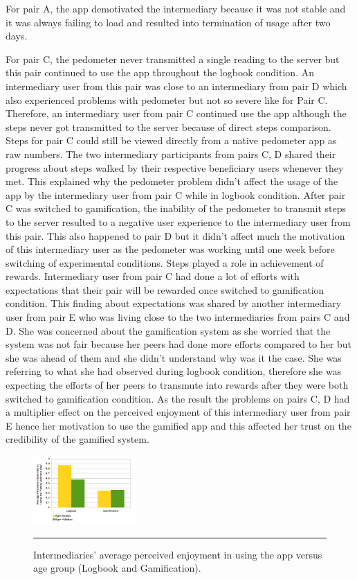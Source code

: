 \documentclass{sig-alternate}
\begin{document}
For pair A, the app demotivated the intermediary because it was not stable  and it was always failing to load and resulted into termination of usage after two days.

For pair C, the pedometer never transmitted a single reading to the server but this pair continued to use the app throughout the logbook condition. An intermediary user from this pair was close to an intermediary from pair D which also experienced problems with pedometer but not so severe like for Pair C. Therefore, an intermediary user from pair C continued use the app although the steps never got transmitted to the server because of direct steps comparison. Steps for pair C could still be viewed directly from a native pedometer app as raw numbers. The two intermediary participants from pairs C, D shared their progress about steps walked by their respective beneficiary users whenever they met. This explained why the pedometer problem didn't affect the usage of the app by the intermediary user from pair C while in logbook condition. After pair C was switched to gamification, the inability of the pedometer to transmit steps to the server resulted to a negative user experience to the intermediary user from this pair. This also happened to pair D but it didn't affect much the motivation of this intermediary user as the pedometer was working until one week before switching of experimental conditions. Steps played a role in achievement of rewards. Intermediary user from pair C had done a lot of efforts with expectations that their pair will be rewarded once switched to gamification condition. This finding about expectations was shared by another intermediary user from pair E who was living close  to the two intermediaries from pairs C and D. She was concerned about the gamification system as she worried that the system was not fair because her peers had done more efforts compared to her but she was ahead of them and she didn't understand why was it the case. She was referring to what she had observed during logbook condition,  therefore she was expecting the efforts of her peers to transmute into rewards after they were both switched to gamification condition. As the result the problems on pairs C, D had a multiplier  effect on the perceived enjoyment of this intermediary user from pair E hence her motivation to use the gamified app and this affected her trust on the credibility of the gamified system.

\begin{figure}[htbp]
  \centering
    \includegraphics[width=0.35\textwidth]{PE_Interm_App_exp_seq.png}
    \rule{26em}{0.5pt}
  \caption{Intermediaries' average perceived enjoyment in using the app versus age group (Logbook and Gamification).}
  \label{figure:PE_Interm_App_exp_seq}
\end{figure}
\end{document}
